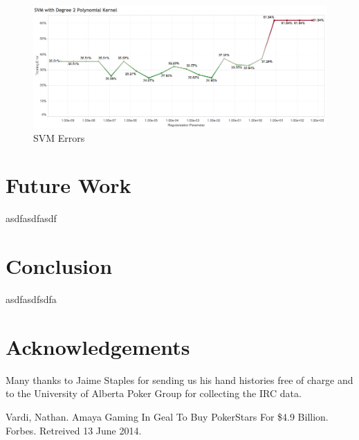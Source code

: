 \documentclass[twoside]{article}
\begin{document}
\begin{multicols}{2}
\begin{figure}[H]
  \centering
  \centerline{\includegraphics[width=1\columnwidth]{SVM.png}}
   \caption{SVM Errors}
  \label{fig:SVM}
\end{figure}


\section{Future Work}

asdfasdfasdf


\section{Conclusion}

asdfasdfsdfa


\section{Acknowledgements}

Many thanks to Jaime Staples for sending us his hand histories free of charge and to the University of Alberta Poker Group for collecting the IRC data. 



\begin{thebibliography}{99} %

 Vardi, Nathan. Amaya Gaming In Geal To Buy PokerStars For \$4.9 Billion. Forbes. Retreived 13 June 2014. 


\end{thebibliography}
\end{multicols}
\end{document}
